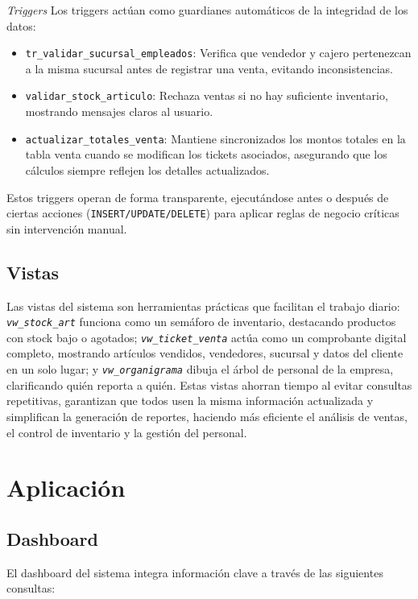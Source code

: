 \documentclass[a4paper, 12pt]{article}
\begin{document}
\textit{Triggers}
Los triggers actúan como guardianes automáticos de la integridad de los datos:
\begin{itemize}
    \item \texttt{tr\_validar\_sucursal\_empleados}: Verifica que vendedor y cajero pertenezcan a la misma sucursal antes de registrar una venta, evitando inconsistencias.
    
    \item \texttt{validar\_stock\_articulo}: Rechaza ventas si no hay suficiente inventario, mostrando mensajes claros al usuario.
    
    \item \texttt{actualizar\_totales\_venta}: Mantiene sincronizados los montos totales en la tabla venta cuando se modifican los tickets asociados, asegurando que los cálculos siempre reflejen los detalles actualizados.
\end{itemize}
Estos triggers operan de forma transparente, ejecutándose antes o después de ciertas acciones (\texttt{INSERT/UPDATE/DELETE}) para aplicar reglas de negocio críticas sin intervención manual.

\subsection{Vistas}

Las vistas del sistema son herramientas prácticas que facilitan el trabajo diario:  
\textit{\texttt{vw\_stock\_art}} funciona como un semáforo de inventario, destacando productos con stock bajo o agotados;  
\textit{\texttt{vw\_ticket\_venta}} actúa como un comprobante digital completo, mostrando artículos vendidos, vendedores, sucursal y datos del cliente en un solo lugar;  
y \textit{\texttt{vw\_organigrama}} dibuja el árbol de personal de la empresa, clarificando quién reporta a quién.  
\vspace{5mm}
Estas vistas ahorran tiempo al evitar consultas repetitivas, garantizan que todos usen la misma información actualizada y simplifican la generación de reportes, haciendo más eficiente el análisis de ventas, el control de inventario y la gestión del personal.
\newpage

\section{Aplicación}
\subsection{Dashboard}
El dashboard del sistema integra información clave a través de las siguientes consultas:
\end{document}
